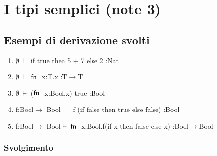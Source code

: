 \section{I tipi semplici (note 3)}
\subsection*{Esempi di derivazione svolti}
 
\begin{enumerate}[label=\alph*)]
	\item $\emptyset\:\vdash$  if true then 5 + 7 else 2 :Nat
	\item $\emptyset\:\vdash$  $\fn$ x:T.x :T$\rightarrow$T
	\item $\emptyset\:\vdash$  ($\fn$ x:Bool.x) true :Bool
	\item f:Bool$\rightarrow$ Bool $\vdash$ f (if false then true else false) :Bool
	\item f:Bool$\rightarrow$ Bool $\vdash\:\fn$ x:Bool.f(if x then false else x) :Bool$\rightarrow$Bool
\end{enumerate}

\subsubsection*{Svolgimento}

